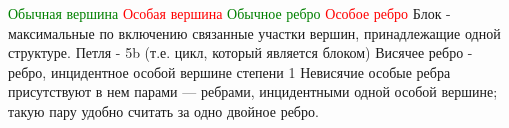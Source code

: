 \documentclass[a4paper,12pt]{article}
\begin{document}
\textcolor{green}{Обычная вершина}\newline
\textcolor{red}{Особая вершина}\newline
\textcolor{green}{Обычное ребро}\newline
\textcolor{red}{Особое ребро}\newline
Блок - максимальные по включению связанные участки вершин, принадлежащие одной структуре.\newline
Петля - 5b (т.е. цикл, который является блоком)\newline
Висячее ребро - ребро, инцидентное особой вершине степени 1\newline
Невисячие особые ребра присутствуют в нем парами — ребрами, инцидентными одной особой вершине; такую пару удобно считать за одно двойное 
ребро.\newline
\end{document}
